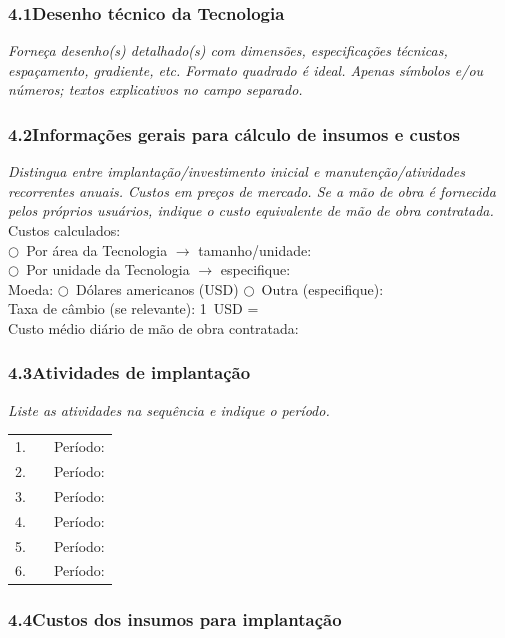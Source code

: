\subsubsection*{4.1\quad Desenho técnico da Tecnologia}
\textit{Forneça desenho(s) detalhado(s) com dimensões, especificações técnicas, espaçamento, gradiente, etc. Formato quadrado é ideal. Apenas símbolos e/ou números; textos explicativos no campo separado.}

\subsubsection*{4.2\quad Informações gerais para cálculo de insumos e custos}
\textit{Distingua entre implantação/investimento inicial e manutenção/atividades recorrentes anuais. Custos em preços de mercado. Se a mão de obra é fornecida pelos próprios usuários, indique o custo equivalente de mão de obra contratada.}\\[4pt]
Custos calculados:\\
$\bigcirc$~Por área da Tecnologia $\rightarrow$ tamanho/unidade: \dotfill\\
$\bigcirc$~Por unidade da Tecnologia $\rightarrow$ especifique: \dotfill\\
Moeda: $\bigcirc$~Dólares americanos (USD) \quad $\bigcirc$~Outra (especifique): \dotfill\\
Taxa de câmbio (se relevante): 1~USD = \dotfill\\
Custo médio diário de mão de obra contratada: \dotfill

\subsubsection*{4.3\quad Atividades de implantação}
\textit{Liste as atividades na sequência e indique o período.}\\[4pt]
\begin{tabular}{clp{4cm}}
1. & \dotfill & Período: \dotfill \\
2. & \dotfill & Período: \dotfill \\
3. & \dotfill & Período: \dotfill \\
4. & \dotfill & Período: \dotfill \\
5. & \dotfill & Período: \dotfill \\
6. & \dotfill & Período: \dotfill \\
\end{tabular}

\subsubsection*{4.4\quad Custos dos insumos para implantação}

